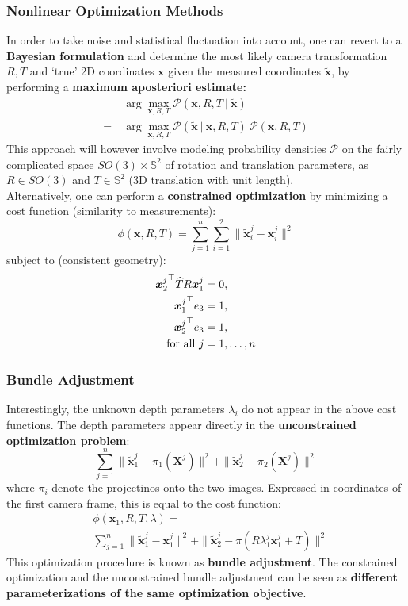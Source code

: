 \subsubsection*{Nonlinear Optimization Methods}%
\label{ssub:nonlinear_optimization_methods}


In order to take noise and statistical fluctuation into account,
one can revert to a \textbf{Bayesian formulation} and determine
the most likely camera transformation $R, T$ and `true'
2D coordinates $\bm{x}$ given the measured coordinates $\bm{\tilde{x}}$,
by performing a \textbf{maximum aposteriori estimate:}
\begin{align*}
	& \arg \max_{\bm{x}, R, T} \mathcal{P}(\bm{x}, R, T\ |\ \bm{\tilde{x}}) \\
	=\ & \arg \max_{\bm{x}, R, T} \mathcal{P}(\bm{\tilde{x}}\ |\ \bm{x}, R, T)
		\ \mathcal{P}(\bm{x}, R, T)
\end{align*}
This approach will however involve modeling probability densities $\mathcal{P}$
on the fairly complicated space $SO(3) \times \mathbb{S}^2$
of rotation and translation parameters, as $R \in SO(3)$ and $T \in \mathbb{S}^2$
(3D translation with unit length).\\

Alternatively, one can perform a \textbf{constrained optimization} by
minimizing a cost function (similarity to measurements):
\[
	\phi (\bm{x}, R, T) =
		\sum_{j=1}^{n} \sum_{i=1}^{2}
		\| \bm{\tilde{x}}_i^j - \bm{x}_i^j \|^2
\]
subject to (consistent geometry):
\begin{align*}
	{\bm{x}_2^j}^{\top} \widehat{T} R \bm{x}_1^j &= 0, \\
	{\bm{x}_1^j}^{\top} e_3 &= 1, \\
	{\bm{x}_2^j}^{\top} e_3 &= 1, \\
	\text{for all}\ j &= 1, \ldots, n
\end{align*}


\subsubsection*{Bundle Adjustment}%
\label{ssub:bundle_adjustment}

Interestingly, the unknown depth parameters $\lambda_i$ do not appear
in the above cost functions. The depth parameters appear directly
in the \textbf{unconstrained optimization problem}:
\[
	\sum_{j=1}^n
		\| \bm{\tilde{x}}_1^j - \pi_1 ( \bm{X}^j ) \|^2
		+ \| \bm{\tilde{x}}_2^j - \pi_2 ( \bm{X}^j ) \|^2
\]
where $\pi_i$ denote the projectinos onto the two images.
Expressed in coordinates of the first camera frame,
this is equal to the cost function:
\begin{align*}
	&\phi( \bm{x}_1, R, T, \lambda ) = \\
	&\sum_{j=1}^n
		\| \bm{\tilde{x}}_1^j - \bm{x}_1^j \|^2
		+ \| \bm{\tilde{x}}_2^j - \pi(R \lambda_1^j \bm{x}_1^j + T) \|^2
\end{align*}
This optimization procedure is known as \textbf{bundle adjustment}.
The constrained optimization and the unconstrained bundle adjustment
can be seen as
\textbf{different parameterizations of the same optimization objective}.


